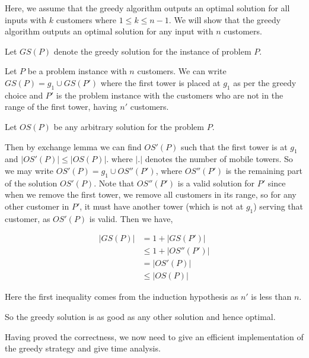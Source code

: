 \documentclass[answers]{exam}
\begin{document}
\begin{questions}

\begin{solution}
Here, we assume that the greedy algorithm outputs an optimal solution for all inputs with $k$ customers where $1 \leq k \leq n - 1$. We will show that the greedy algorithm outputs an optimal solution for any input with $n$ customers. 

Let $GS(P)$ denote the greedy solution for the instance of problem $P$.

Let $P$ be a problem instance with $n$ customers.
We can write $GS(P) = g_{1} \cup GS(P')$ where the first tower is placed at $g_{1}$ as per the greedy choice and $P'$ is the problem instance with the customers who are not in the range of the first tower, having $n'$ customers.

Let $OS(P)$ be any arbitrary solution for the problem $P$.

Then by exchange lemma we can find $OS'(P)$ such that the first tower is at $g_{1}$ and $|OS'(P)| \leq |OS(P)|$. where $|.|$ denotes the number of mobile towers. So we may write $OS'(P) = g_{1} \cup OS''(P')$, where $OS''(P')$ is the remaining part of the solution $OS'(P)$. Note that $OS''(P')$ is a valid solution for $P'$ since when we remove the first tower, we remove all customers in its range, so for any other customer in $P'$, it must have another tower (which is not at $g_1$) serving that customer, as $OS'(P)$ is valid.
Then we have,

\begin{align*}
    |GS(P)| &= 1 + |GS(P')|\\
          &\leq 1 + |OS''(P')|\\
          &= |OS'(P)|\\
          &\leq |OS(P)|
\end{align*}

Here the first inequality comes from the induction hypothesis as $n'$ is less than $n$.

So the greedy solution is as good as any other solution and hence optimal.
\end{solution}



Having proved the correctness, we now need to give an efficient implementation of the greedy strategy and give time analysis.



\end{questions}
\end{document}
